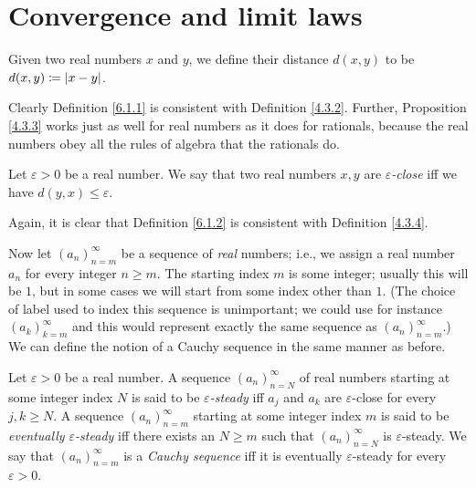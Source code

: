 \section{Convergence and limit laws}\label{sec 6.1}

\begin{definition}\label{6.1.1}
    Given two real numbers \(x\) and \(y\), we define their distance \(d(x, y)\) to be \(d(x, y) \coloneqq \abs*{x - y}\).
\end{definition}

\begin{note}
    Clearly Definition \ref{6.1.1} is consistent with Definition \ref{4.3.2}.
    Further, Proposition \ref{4.3.3} works just as well for real numbers as it does for rationals, because the real numbers obey all the rules of algebra that the rationals do.
\end{note}

\begin{definition}\label{6.1.2}
    Let \(\varepsilon > 0\) be a real number.
    We say that two real numbers \(x, y\) are \emph{\(\varepsilon\)-close} iff we have \(d(y, x) \leq \varepsilon\).
\end{definition}

\begin{note}
    Again, it is clear that Definition \ref{6.1.2} is consistent with Definition \ref{4.3.4}.
\end{note}

\begin{note}
    Now let \((a_n)_{n = m}^\infty\) be a sequence of \emph{real} numbers;
    i.e., we assign a real number \(a_n\) for every integer \(n \geq m\).
    The starting index \(m\) is some integer;
    usually this will be \(1\), but in some cases we will start from some index other than \(1\).
    (The choice of label used to index this sequence is unimportant; we could use for instance \((a_k)_{k = m}^{\infty}\) and this would represent exactly the same sequence as \((a_n)_{n = m}^{\infty}\).)
    We can define the notion of a Cauchy sequence in the same manner as before.
\end{note}

\begin{definition}\label{6.1.3}
    Let \(\varepsilon > 0\) be a real number.
    A sequence \((a_n)_{n = N}^\infty\) of real numbers starting at some integer index \(N\) is said to be \emph{\(\varepsilon\)-steady} iff \(a_j\) and \(a_k\) are \(\varepsilon\)-close for every \(j, k \geq N\).
    A sequence \((a_n)_{n = m}^\infty\) starting at some integer index \(m\) is said to be \emph{eventually \(\varepsilon\)-steady} iff there exists an \(N \geq m\) such that \((a_n)_{n = N}^\infty\) is \(\varepsilon\)-steady.
    We say that \((a_n)_{n = m}^\infty\) is a \emph{Cauchy sequence} iff it is eventually \(\varepsilon\)-steady for every \(\varepsilon > 0\).
\end{definition}

